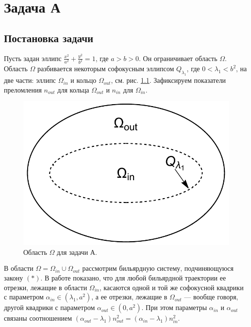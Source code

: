 \chapter{Задача А}\label{sec:ch4}
\section{Постановка задачи}\label{sec:ch4/sec1}
Пусть задан эллипс $\frac{x^2}{a^2} + \frac{y^2}{b^2} =1$, где $a > b>0$. 
Он ограничивает область $\Omega$.
Область $\Omega$ разбивается некоторым софокусным эллипсом $Q_{\lambda_1}$, где $0 < \lambda_1 < b^2$, на две части: эллипс $\Omega_{in}$ и кольцо $\Omega_{out}$, см. рис. \ref{fig:pt9:_problemA}. Зафиксируем показатели преломления $n_{out}$ для кольца $\Omega_{out}$ и $n_{in}$ для $\Omega_{in}$.

\begin{figure}[!htb]
\centering
\includegraphics[scale=0.4]{images/ch4/section2/domain_problemA.pdf}
    \caption{Область $\Omega$ для задачи А.}
    \label{fig:pt9:_problemA}
\end{figure}

В области $\Omega = \Omega_{in} \cup \Omega_{out}$ рассмотрим бильярдную систему, подчиняющуюся закону $(\ast)$. В работе \cite{vestnikLatest} показано, что для любой бильярдной траектории ее отрезки, лежащие в области $\Omega_{in}$, касаются одной и той же  софокусной квадрики с параметром $\alpha_{in} \in (\lambda_1, a^2)$, а ее отрезки, лежащие в $\Omega_{out}$ --- вообще говоря, другой квадрики с параметром $\alpha_{out} \in (0, a^2)$. При этом параметры $\alpha_{in}$ и $\alpha_{out}$ связаны соотношением $(\alpha_{out} - \lambda_1) n_{out}^2 = (\alpha_{in} - \lambda_1) n_{in}^2$.

